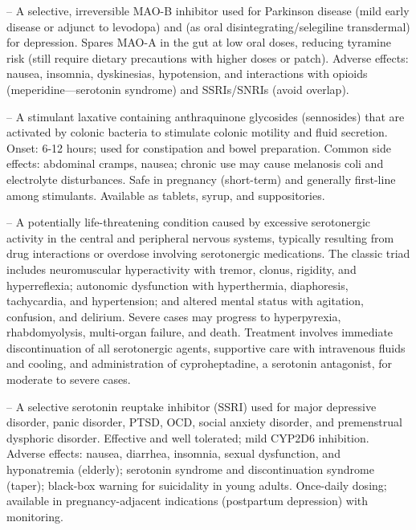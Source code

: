 -- A selective, irreversible MAO-B inhibitor used for Parkinson disease (mild early disease or adjunct to levodopa) and (as oral disintegrating/selegiline transdermal) for depression. Spares MAO-A in the gut at low oral doses, reducing tyramine risk (still require dietary precautions with higher doses or patch). Adverse effects: nausea, insomnia, dyskinesias, hypotension, and interactions with opioids (meperidine—serotonin syndrome) and SSRIs/SNRIs (avoid overlap).

-- A stimulant laxative containing anthraquinone glycosides (sennosides) that are activated by colonic bacteria to stimulate colonic motility and fluid secretion. Onset: 6-12 hours; used for constipation and bowel preparation. Common side effects: abdominal cramps, nausea; chronic use may cause melanosis coli and electrolyte disturbances. Safe in pregnancy (short-term) and generally first-line among stimulants. Available as tablets, syrup, and suppositories.

-- A potentially life-threatening condition caused by excessive serotonergic activity in the central and peripheral nervous systems, typically resulting from drug interactions or overdose involving serotonergic medications. The classic triad includes neuromuscular hyperactivity with tremor, clonus, rigidity, and hyperreflexia; autonomic dysfunction with hyperthermia, diaphoresis, tachycardia, and hypertension; and altered mental status with agitation, confusion, and delirium. Severe cases may progress to hyperpyrexia, rhabdomyolysis, multi-organ failure, and death. Treatment involves immediate discontinuation of all serotonergic agents, supportive care with intravenous fluids and cooling, and administration of cyproheptadine, a serotonin antagonist, for moderate to severe cases.

-- A selective serotonin reuptake inhibitor (SSRI) used for major depressive disorder, panic disorder, PTSD, OCD, social anxiety disorder, and premenstrual dysphoric disorder. Effective and well tolerated; mild CYP2D6 inhibition. Adverse effects: nausea, diarrhea, insomnia, sexual dysfunction, and hyponatremia (elderly); serotonin syndrome and discontinuation syndrome (taper); black-box warning for suicidality in young adults. Once-daily dosing; available in pregnancy-adjacent indications (postpartum depression) with monitoring.

